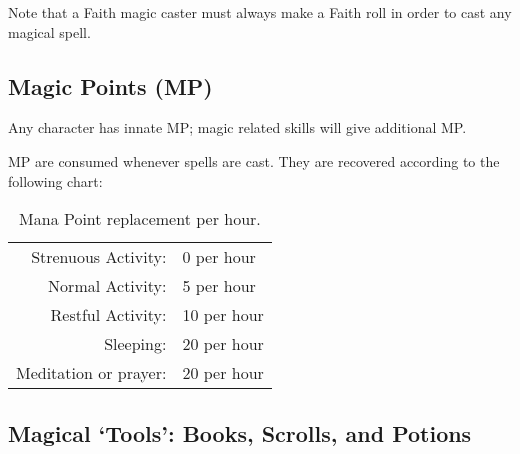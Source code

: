 \documentclass[twoside]{book}
\begin{document}
    {  
      Note that a Faith magic caster must always make a
             Faith roll in order to cast any magical spell. 
    }
  
    

\subsection{Magic Points (MP)}
    
    {  
      Any character has innate MP; magic related skills
               will give additional MP. 
    }
  
    {  
      MP are consumed whenever spells are cast. They are
               recovered according to the following chart: 
    }
  
\begin{table}[htb]
  \begin{center}

  \begin{tabular}{|r|l|}
  \hline
    
  \textscbf{}&
  \textscbf{}\\
  \hline
  \hline
       Strenuous Activity: & 0 per hour \\

\hline

 Normal Activity: & 5 per hour \\

\hline

 Restful Activity: & 10 per hour \\

\hline

 Sleeping: & 20 per hour \\

\hline

 Meditation or prayer: & 20 per hour \\

\hline


  \end{tabular}
  
\caption{Mana Point replacement per hour.}
  
  \end{center}
\end{table}
  
    

\subsection{Magical `Tools': Books, Scrolls, and
               Potions}
    
\end{document}
